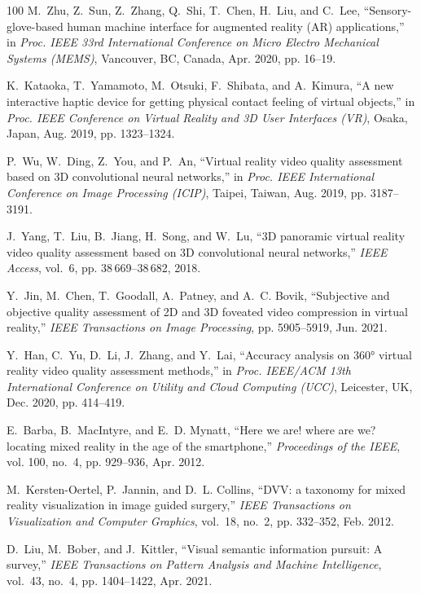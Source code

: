 \documentclass[journal]{IEEEtran}
\begin{document}
\begin{thebibliography}{100}
	M.~Zhu, Z.~Sun, Z.~Zhang, Q.~Shi, T.~Chen, H.~Liu, and C.~Lee,
	``Sensory-glove-based human machine interface for augmented reality ({AR})
	applications,'' in \emph{Proc. IEEE 33rd International Conference on Micro
		Electro Mechanical Systems (MEMS)}, Vancouver, BC, Canada, Apr. 2020, pp.
	16--19.
	
	K.~Kataoka, T.~Yamamoto, M.~Otsuki, F.~Shibata, and A.~Kimura, ``A new
	interactive haptic device for getting physical contact feeling of virtual
	objects,'' in \emph{Proc. IEEE Conference on Virtual Reality and 3D User
		Interfaces (VR)}, Osaka, Japan, Aug. 2019, pp. 1323--1324.
	
	P.~Wu, W.~Ding, Z.~You, and P.~An, ``Virtual reality video quality assessment
	based on {3D} convolutional neural networks,'' in \emph{Proc. IEEE
		International Conference on Image Processing (ICIP)}, Taipei, Taiwan, Aug.
	2019, pp. 3187--3191.
	
	J.~Yang, T.~Liu, B.~Jiang, H.~Song, and W.~Lu, ``{3D} panoramic virtual reality
	video quality assessment based on {3D} convolutional neural networks,''
	\emph{IEEE Access}, vol.~6, pp. 38\,669--38\,682, 2018.
	
	Y.~Jin, M.~Chen, T.~Goodall, A.~Patney, and A.~C. Bovik, ``Subjective and
	objective quality assessment of {2D} and {3D} foveated video compression in
	virtual reality,'' \emph{IEEE Transactions on Image Processing}, pp.
	5905--5919, Jun. 2021.
	
	Y.~Han, C.~Yu, D.~Li, J.~Zhang, and Y.~Lai, ``Accuracy analysis on {360°}
	virtual reality video quality assessment methods,'' in \emph{Proc. IEEE/ACM
		13th International Conference on Utility and Cloud Computing (UCC)},
	Leicester, UK, Dec. 2020, pp. 414--419.
	
	E.~Barba, B.~MacIntyre, and E.~D. Mynatt, ``Here we are! where are we? locating
	mixed reality in the age of the smartphone,'' \emph{Proceedings of the IEEE},
	vol. 100, no.~4, pp. 929--936, Apr. 2012.
	
	M.~Kersten-Oertel, P.~Jannin, and D.~L. Collins, ``{DVV}: a taxonomy for mixed
	reality visualization in image guided surgery,'' \emph{IEEE Transactions on
		Visualization and Computer Graphics}, vol.~18, no.~2, pp. 332--352, Feb.
	2012.
	
	D.~Liu, M.~Bober, and J.~Kittler, ``Visual semantic information pursuit: A
	survey,'' \emph{IEEE Transactions on Pattern Analysis and Machine
		Intelligence}, vol.~43, no.~4, pp. 1404--1422, Apr. 2021.
	

\end{thebibliography}
\end{document}
